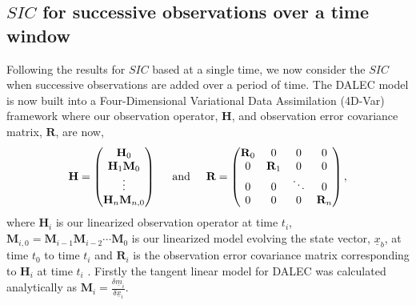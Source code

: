 \documentclass[11pt]{article}
\begin{document}
\subsection{$SIC$ for successive observations over a time window}

Following the results for $SIC$ based at a single time, we now consider the $SIC$ when successive observations are added over a period of time. The DALEC model is now built into a Four-Dimensional Variational Data Assimilation (4D-Var) framework where our observation operator, $\textbf{H}$, and observation error covariance matrix, $\textbf{R}$, are now,
\[ 
\textbf{H}=
\begin{pmatrix}
\textbf{H}_0 \\
\textbf{H}_1\textbf{M}_0\\
\vdots \\
\textbf{H}_n\textbf{M}_{n,0}
\end{pmatrix}
\hspace{5mm} \text{and} \hspace{5mm}
\textbf{R}=
\begin{pmatrix}
\textbf{R}_0 & 0 & 0 & 0 \\
0 & \textbf{R}_1 & 0 & 0 \\
0 & 0 & \ddots & 0 \\
0 & 0 & 0 & \textbf{R}_n
\end{pmatrix},
\]
where $\textbf{H}_i$ is our linearized observation operator at time $t_i$, $\textbf{M}_{i,0}=\textbf{M}_{i-1}\textbf{M}_{i-2}\cdots\textbf{M}_0$ is our linearized model evolving the state vector, $\underline{x}_b$, at time $t_0$ to time $t_i$ and $\textbf{R}_i$ is the observation error covariance matrix corresponding to $\textbf{H}_i$ at time $t_i$ \cite{lewis2006dynamic}. Firstly the tangent linear model for DALEC was calculated analytically as $\textbf{M}_i=\frac{\delta \underline{m}_i}{\delta \underline{x}_i}$.
\end{document}
